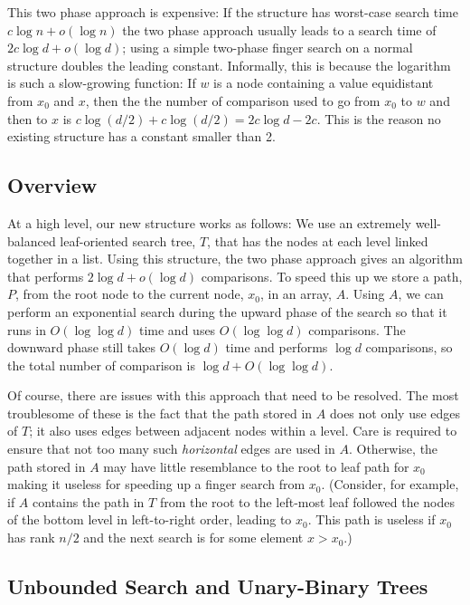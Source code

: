 \documentclass{patmorin}
\begin{document}
This two phase approach is expensive: If the structure has worst-case
search time $c\log n+o(\log n)$ the two phase approach usually leads to
a search time of $2c\log d+o(\log d)$; using a simple two-phase finger
search on a normal structure doubles the leading constant.  Informally,
this is because the logarithm is such a slow-growing function: If $w$
is a node containing a value equidistant from $x_0$ and $x$, then the
the number of comparison used to go from $x_0$ to $w$ and then to $x$
is $c\log(d/2) + c\log(d/2) = 2c\log d - 2c$.  This is the reason no
existing structure has a constant smaller than 2.

\subsection{Overview}

At a high level, our new structure works as follows: We use an extremely
well-balanced leaf-oriented search tree, $T$, that has the nodes at
each level linked together in a list.  Using this structure, the two
phase approach gives an algorithm that performs $2\log d+o(\log d)$
comparisons.  To speed this up we store a path, $P$, from the root node
to the current node, $x_0$, in an array, $A$. Using $A$, we can perform
an exponential search during the upward phase of the search so that
it runs in $O(\log\log d)$ time and uses $O(\log\log d)$ comparisons.
The downward phase still takes $O(\log d)$ time and performs $\log d$
comparisons, so the total number of comparison is $\log d+O(\log\log d)$.

Of course, there are issues with this approach that need to be resolved.
The most troublesome of these is the fact that the path stored in $A$
does not only use edges of $T$; it also uses edges between adjacent
nodes within a level.  Care is required to ensure that not too many such
\emph{horizontal} edges are used in $A$. Otherwise, the path stored in $A$
may have little resemblance to the root to leaf path for $x_0$ making
it useless for speeding up a finger search from $x_0$. (Consider, for
example, if $A$ contains the path in $T$ from the root to the left-most
leaf followed the nodes of the bottom level in left-to-right order,
leading to $x_0$.  This path is useless if $x_0$ has rank $n/2$ and the
next search is for some element $x>x_0$.)

\subsection{Unbounded Search and Unary-Binary Trees}
\end{document}
